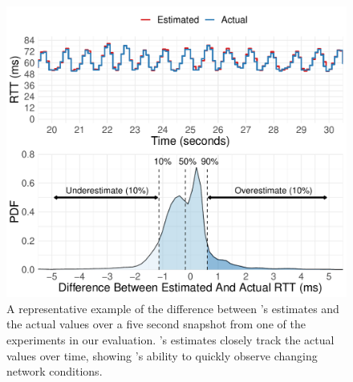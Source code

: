 \begin{figure}
    \centering
\begin{knitrout}
\color{fgcolor}
\includegraphics[width=\maxwidth]{figure/micro:time-delay-1} 

\end{knitrout}

    \caption{A representative example of the difference between \name's estimates and the actual values over a five second snapshot from one of the experiments in our evaluation. \name's estimates closely track the actual values over time, showing \name's ability to quickly observe changing network conditions. }
    \label{fig:micro:time-delay}
\end{figure}
